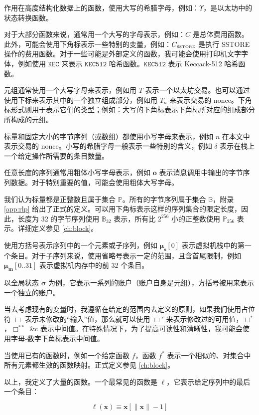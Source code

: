 \documentclass[9pt,oneside]{amsart}
\begin{document}
\begin{multicols}{2}
作用在高度结构化数据上的函数，使用大写的希腊字母，例如：$\Upsilon$，是以太坊中的状态转换函数。

对于大部分函数来说，通常用一个大写的字母表示，例如：$C$ 是总体费用函数。此外，可能会使用下角标表示一些特别的变量，例如：$C_\text{\tiny SSTORE}$ 是执行 {\tiny SSTORE} 操作的费用函数。对于一些可能是外部定义的函数，我可能会使用打印机文字字体，例如使用 $\texttt{KEC}$ 来表示 $\texttt{KEC512}$ 哈希函数。$\texttt{KEC512}$ 表示 Keccack-512 哈希函数。

元组通常使用一个大写字母来表示，例如用 $T$ 表示一个以太坊交易。也可以通过使用下标来表示其中的一个独立组成部分，例如用 $T_n$ 来表示交易的 nonce。下角标形式则用于表示它们的类型；例如：大写的下角标表示下角标所对应的组成部分所构成的元组。

标量和固定大小的字节序列（或数组）都使用小写字母来表示，例如 $n$ 在本文中表示交易的 nonce。小写的希腊字母一般表示一些特别的含义，例如 $\delta$ 表示在栈上一个给定操作所需要的条目数量。

任意长度的序列通常用粗体小写字母表示，例如 $\mathbf{o}$ 表示消息调用中输出的字节序列数据。对于特别重要的值，可能会使用粗体大写字母。

我们认为标量都是正整数且属于集合 $\mathbb{P}$。所有的字节序列属于集合 $\mathbb{B}$，附录 \ref{app:rlp} 给出了正式的定义。可以用下角标表示这样的序列集合的限定长度，因此，长度为 32 的字节序列使用 $\mathbb{B}_{32}$ 表示，所有比 $2^{256}$ 小的正整数使用 $\mathbb{P}_{256}$ 表示。详细定义参见 \ref{ch:block}。

使用方括号表示序列中的一个元素或子序列，例如 $\boldsymbol{\mu}_\mathbf{s}[0]$ 表示虚拟机栈中的第一个条目。对于子序列来说，使用省略号表示一定的范围，且含首尾限制，例如 $\boldsymbol{\mu}_\mathbf{m}[0..31]$ 表示虚拟机内存中的前 32 个条目。

以全局状态 $\boldsymbol{\sigma}$ 为例，它表示一系列的账户（账户自身是元组），方括号被用来表示一个独立的账户。

当去考虑现有的变量时，我遵循在给定的范围内去定义的原则，如果我们使用占位符 $\Box$ 表示未修改的“输入”值，那么就可以使用 $\Box'$ 来表示修改过的可用值，$\Box^*$，$\Box^{**}$ \&c 表示中间值。在特殊情况下，为了提高可读性和清晰性，我可能会使用字母-数字下角标表示中间值。

当使用已有的函数时，例如一个给定函数 $f$，函数 $f^*$ 表示一个相似的、对集合中所有元素都生效的函数映射。正式定义参见 \ref{ch:block}。

以上，我定义了大量的函数。一个最常见的函数是 $\ell$，它表示给定序列中的最后一个条目：


\begin{equation}
\ell(\mathbf{x}) \equiv \mathbf{x}[\lVert \mathbf{x} \rVert - 1]
\end{equation}



\end{multicols}
\end{document}
